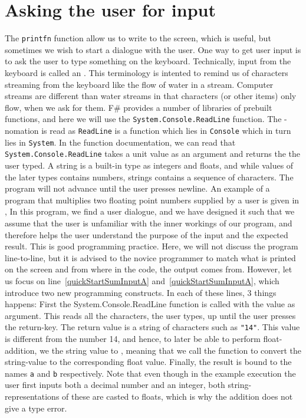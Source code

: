 \documentclass[springer.tex]{subfiles}
\begin{document}
\section{Asking the user for input}
\label{sec:readline}
The \lstinline{printfn} function allow us to write to the screen, which is useful, but sometimes we wish to start a dialogue with the user. One way to get user input is to ask the user to type something on the keyboard. Technically, input from the keyboard is called an  . This terminology is intented to remind us of characters streaming from the keyboard like the flow of water in a stream. Computer streams are different than water streams in that characters (or other items) only flow, when we ask for them. F\# provides a number of libraries of prebuilt functions, and here we will use the \lstinline{System.Console.ReadLine} function. The -nomation is read as \lstinline{ReadLine} is a function which lies in \lstinline{Console} which in turn lies in \lstinline{System}. In the function documentation, we can read that \lstinline{System.Console.ReadLine} takes a unit value as an argument and returns the  the user typed. A string is a built-in type as integers and floats, and while values of the later types contains numbers, strings contains a sequence of characters. The program will not advance until the user presses newline. An example of a program that multiplies two floating point numbers supplied by a user is given in ,
% 
%
In this program, we find a user dialogue, and we have designed it such that we assume that the user is unfamiliar with the inner workings of our program, and therefore helps the user understand the purpose of the input and the expected result. This is good programming practice. Here, we will not discuss the program line-to-line, but it is advised to the novice programmer to match what is printed on the screen and from where in the code, the output comes from. However, let us focus on line~\ref{quickStartSumInputA} and~\ref{quickStartSumInputA}, which introduce two new programming constructs. In each of these lines, 3 things happens: First the System.Console.ReadLine function is called with the \lexeme{()} value as argument. This reads all the characters, the user types, up until the user presses the return-key. The return value is a string of characters such as \lstinline{"14"}. This value is different from the number 14, and hence, to later be able to perform float-addition, we  the string value to , meaning that we call the function  to convert the string-value to the corresponding float value. Finally, the result is bound to the names \lstinline{a} and \lstinline{b} respectively. Note that even though in the example execution the user first inputs both a decimal number and an integer, both string-representations of these are casted to floats, which is why the addition does not give a type error.
\end{document}
